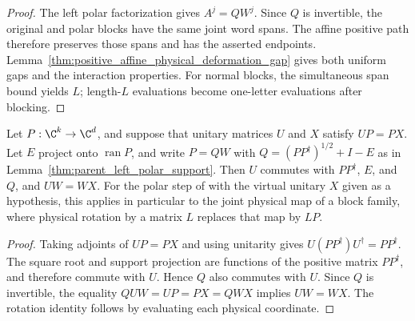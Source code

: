 \begin{proof}
    \leanok
    The left polar factorization gives $A^j=QW^j$. Since $Q$ is
    invertible, the original and polar blocks have the same joint word
    spans. The affine positive path therefore preserves those spans
    and has the asserted endpoints. Lemma~\ref{thm:positive_affine_physical_deformation_gap}
    gives both uniform gaps and the interaction properties.
    For normal blocks, the simultaneous span bound yields $L$;
    length-$L$ evaluations become one-letter evaluations after blocking.
\end{proof}

\begin{lemma}
    \label{thm:parent_polar_unitary_covariance}
    \leanok
    Let $P:\C^k\to\C^d$, and suppose that unitary matrices $U$ and
    $X$ satisfy $UP=PX$. Let $E$ project onto $\operatorname{ran}P$, and
    write $P=QW$ with $Q=(PP^\dagger)^{1/2}+I-E$ as in
    Lemma~\ref{thm:parent_left_polar_support}. Then $U$ commutes with
    $PP^\dagger$, $E$, and $Q$, and $UW=WX$.
    For the polar step of \cite[lines~645--676]{Schuch2011Phases} with the
    virtual unitary $X$ given as a hypothesis, this applies in particular to
    the joint physical map of a block family, where physical rotation by a
    matrix $L$ replaces that map by $LP$.
\end{lemma}

\begin{proof}
    \leanok
    Taking adjoints of $UP=PX$ and using unitarity gives
    $U(PP^\dagger)U^\dagger=PP^\dagger$.
    The square root and support projection are functions of the positive
    matrix $PP^\dagger$, and therefore commute with $U$. Hence $Q$
    also commutes with $U$. Since $Q$ is invertible, the equality
    $QUW=UP=PX=QWX$ implies $UW=WX$.
    The rotation identity follows by evaluating each physical coordinate.
\end{proof}

